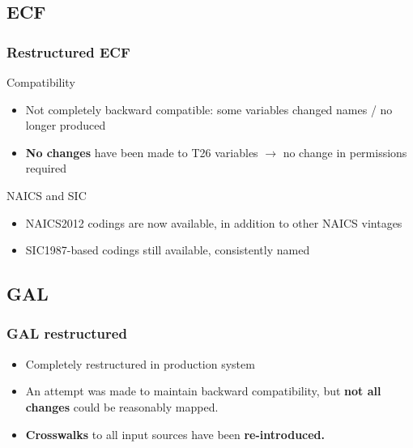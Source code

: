 \documentclass[aspectratio=169]{beamer}
\begin{document}
\subsection{ECF}

\begin{frame}[fragile]
	\frametitle{Restructured \ac{ECF}}
\begin{block}{Compatibility}
\begin{itemize}
	\item Not completely backward compatible: some variables   changed names / no longer produced 
	\item \textbf{No changes} have been made to T26 variables $\rightarrow$ no change in permissions required
\end{itemize}
\end{block}

\begin{block}{NAICS and SIC}
	\begin{itemize}
	\item NAICS2012 codings are now available, in addition to other NAICS vintages
	\item SIC1987-based codings  still available, consistently named 
	\end{itemize}
\end{block}
\end{frame}


\subsection{GAL}

\begin{frame}
	\frametitle{\ac{GAL} restructured}
\begin{itemize}
	\item Completely restructured in production system 
	\item An attempt was made to maintain backward compatibility, but \textbf{not all changes} could be reasonably mapped. 
	\item \textbf{Crosswalks} to all input sources have been \textbf{re-introduced.}
\end{itemize}
\end{frame}
\end{document}
